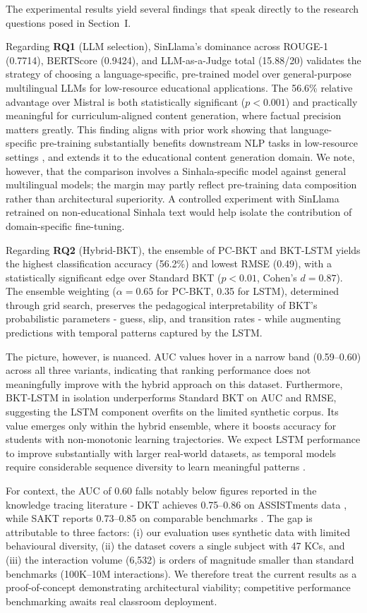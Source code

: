 \documentclass[conference]{IEEEtran}
\begin{document}
The experimental results yield several findings that speak directly to the research questions posed in Section~I.

Regarding \textbf{RQ1} (LLM selection), SinLlama's dominance across ROUGE-1 (0.7714), BERTScore (0.9424), and LLM-as-a-Judge total (15.88/20) validates the strategy of choosing a language-specific, pre-trained model over general-purpose multilingual LLMs for low-resource educational applications. The 56.6\% relative advantage over Mistral is both statistically significant ($p < 0.001$) and practically meaningful for curriculum-aligned content generation, where factual precision matters greatly. This finding aligns with prior work showing that language-specific pre-training substantially benefits downstream NLP tasks in low-resource settings \cite{b7}, and extends it to the educational content generation domain. We note, however, that the comparison involves a Sinhala-specific model against general multilingual models; the margin may partly reflect pre-training data composition rather than architectural superiority. A controlled experiment with SinLlama retrained on non-educational Sinhala text would help isolate the contribution of domain-specific fine-tuning.

Regarding \textbf{RQ2} (Hybrid-BKT), the ensemble of PC-BKT and BKT-LSTM yields the highest classification accuracy (56.2\%) and lowest RMSE (0.49), with a statistically significant edge over Standard BKT ($p < 0.01$, Cohen's $d = 0.87$). The ensemble weighting ($\alpha = 0.65$ for PC-BKT, 0.35 for LSTM), determined through grid search, preserves the pedagogical interpretability of BKT's probabilistic parameters - guess, slip, and transition rates - while augmenting predictions with temporal patterns captured by the LSTM.

The picture, however, is nuanced. AUC values hover in a narrow band (0.59--0.60) across all three variants, indicating that ranking performance does not meaningfully improve with the hybrid approach on this dataset. Furthermore, BKT-LSTM in isolation underperforms Standard BKT on AUC and RMSE, suggesting the LSTM component overfits on the limited synthetic corpus. Its value emerges only within the hybrid ensemble, where it boosts accuracy for students with non-monotonic learning trajectories. We expect LSTM performance to improve substantially with larger real-world datasets, as temporal models require considerable sequence diversity to learn meaningful patterns \cite{b17}.

For context, the AUC of 0.60 falls notably below figures reported in the knowledge tracing literature - DKT achieves 0.75--0.86 on ASSISTments data \cite{b17}, while SAKT reports 0.73--0.85 on comparable benchmarks \cite{b18}. The gap is attributable to three factors: (i) our evaluation uses synthetic data with limited behavioural diversity, (ii) the dataset covers a single subject with 47 KCs, and (iii) the interaction volume (6,532) is orders of magnitude smaller than standard benchmarks (100K--10M interactions). We therefore treat the current results as a proof-of-concept demonstrating architectural viability; competitive performance benchmarking awaits real classroom deployment.
\end{document}
